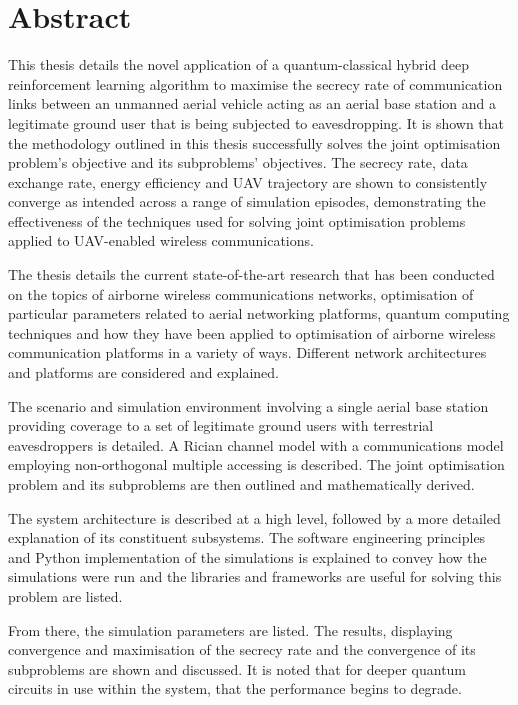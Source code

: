 \documentclass[a4paper,oneside,12pt]{book}
\numberwithin{equation}{chapter} %
\begin{document}
\clearpage
{}
{}
\chapter*{Abstract}
This thesis details the novel application of a quantum-classical hybrid deep reinforcement learning algorithm to maximise the secrecy rate of communication links between an unmanned aerial vehicle acting as an aerial base station and a legitimate ground user that is being subjected to eavesdropping. 
It is shown that the methodology outlined in this thesis successfully solves the joint optimisation problem's objective and its subproblems' objectives. 
The secrecy rate, data exchange rate, energy efficiency and UAV trajectory are shown to consistently converge as intended across a range of simulation episodes, demonstrating the effectiveness of the techniques used for solving joint optimisation problems applied to UAV-enabled wireless communications.

The thesis details the current state-of-the-art research that has been conducted on the topics of airborne wireless communications networks, optimisation of particular parameters related to aerial networking platforms, quantum computing techniques and how they have been applied to optimisation of airborne wireless communication platforms in a variety of ways. 
Different network architectures and platforms are considered and explained. 

The scenario and simulation environment involving a single aerial base station providing coverage to a set of legitimate ground users with terrestrial eavesdroppers is detailed. 
A Rician channel model with a communications model employing non-orthogonal multiple accessing is described. 
The joint optimisation problem and its subproblems are then outlined and mathematically derived. 

The system architecture is described at a high level, followed by a more detailed explanation of its constituent subsystems. 
The software engineering principles and Python implementation of the simulations is explained to convey how the simulations were run and the libraries and frameworks are useful for solving this problem are listed.

From there, the simulation parameters are listed.
The results, displaying convergence and maximisation of the secrecy rate and the convergence of its subproblems are shown and discussed. 
It is noted that for deeper quantum circuits in use within the system, that the performance begins to degrade. 
\end{document}
